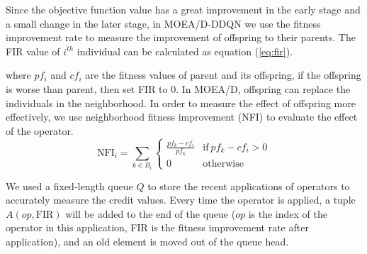\documentclass[journal]{IEEEtran}
\newcommand{\TODO}[1]{\textcolor[rgb]{1.00,0.40,0.22}{#1}}
\begin{document}
Since the objective function value has a great improvement in the early stage and a small change in the later stage, in MOEA/D-DDQN we use the fitness improvement rate to measure the improvement of offspring to their parents.
The FIR value of $i^{th}$ individual can be calculated as equation (\ref{eq:fir}).



where $pf_{i}$ and $cf_{i}$ are the fitness values of parent and its offspring, if the offspring is worse than parent, then set FIR to 0.
In MOEA/D, offspring can replace the individuals in the neighborhood. In order to measure the effect of offspring more effectively, we use neighborhood fitness improvement (NFI) to evaluate the effect of the operator.
\begin{equation}
  \text{NFI}_{i}= \sum_{k \in B_i}
  \left\{
  \begin{array}{ll}
    \frac{pf_{k}-cf_{i}}{pf_{k}} & \text{if}\ pf_{k}-cf_{i}>0 \\

    0                            & \text{otherwise}
  \end{array}
  \right.
\end{equation}


We used a fixed-length queue $Q$ to store the recent applications of operators to accurately measure the credit values.
Every time the operator is applied, a tuple $A (op, \text{FIR})$ will be added to the end of the queue ($op$ is the index of the operator in this application, FIR is the fitness improvement rate after application), and an old element is moved out of the queue head.
\end{document}
